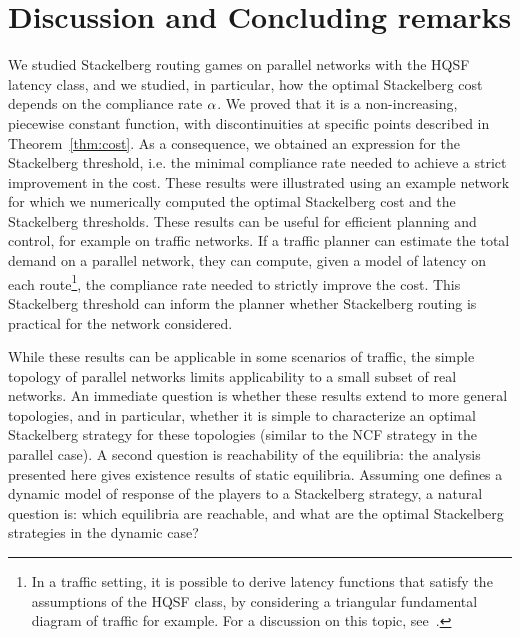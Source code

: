 
\section{Discussion and Concluding remarks}
\label{sec:conclusion}

We studied Stackelberg routing games on parallel networks with the HQSF latency class, and we studied, in particular, how the optimal Stackelberg cost depends on the compliance rate $\alpha$. We proved that it is a non-increasing, piecewise constant function, with discontinuities at specific points described in Theorem~\ref{thm:cost}. As a consequence, we obtained an expression for the Stackelberg threshold, i.e. the minimal compliance rate needed to achieve a strict improvement in the cost. These results were illustrated using an example network for which we numerically computed the optimal Stackelberg cost and the Stackelberg thresholds. These results can be useful for efficient planning and control, for example on traffic networks. If a traffic planner can estimate the total demand on a parallel network, they can compute, given a model of latency on each route\footnote{In a traffic setting, it is possible to derive latency functions that satisfy the assumptions of the HQSF class, by considering a triangular fundamental diagram of traffic for example. For a discussion on this topic, see~\cite{krichene12}.}, the compliance rate needed to strictly improve the cost. This Stackelberg threshold can inform the planner whether Stackelberg routing is practical for the network considered.

While these results can be applicable in some scenarios of traffic, the simple topology of parallel networks limits applicability to a small subset of real networks. An immediate question is whether these results extend to more general topologies, and in particular, whether it is simple to characterize an optimal Stackelberg strategy for these topologies (similar to the NCF strategy in the parallel case). A second question is reachability of the equilibria: the analysis presented here gives existence results of static equilibria. Assuming one defines a dynamic model of response of the players to a Stackelberg strategy, a natural question is: which equilibria are reachable, and what are the optimal Stackelberg strategies in the dynamic case?


\addtolength{\textheight}{-12cm}   %
